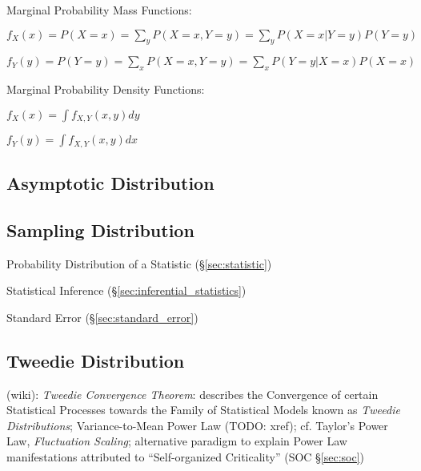 Marginal Probability Mass Functions:

$f_X(x) = P(X = x) = \sum_y P(X = x, Y = y) = \sum_y P(X = x | Y = y) P(Y = y)$

$f_Y(y) = P(Y = y) = \sum_x P(X = x, Y = y) = \sum_x P(Y = y | X = x) P(X = x)$

Marginal Probability Density Functions:

$f_X(x) = \int f_{X,Y}(x,y) dy$

$f_Y(y) = \int f_{X,Y}(x,y) dx$



\subsection{Asymptotic Distribution}\label{sec:asymptotic_distribution}

\subsection{Sampling Distribution}\label{sec:sampling_distribution}

Probability Distribution of a Statistic (\S\ref{sec:statistic})

Statistical Inference (\S\ref{sec:inferential_statistics})

Standard Error (\S\ref{sec:standard_error})



\subsection{Tweedie Distribution}\label{sec:tweedie_distribution}

(wiki): \emph{Tweedie Convergence Theorem}: describes the Convergence of certain
Statistical Processes towards the Family of Statistical Models known as
\emph{Tweedie Distributions}; Variance-to-Mean Power Law (TODO: xref); cf.
Taylor's Power Law, \emph{Fluctuation Scaling}; alternative paradigm to explain
Power Law manifestations attributed to ``Self-organized Criticality''
(SOC \S\ref{sec:soc})


